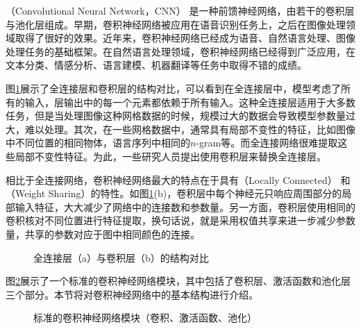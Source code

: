 （Convolutional Neural Network，CNN） 是一种前馈神经网络，由若干的卷积层与池化层组成。早期，卷积神经网络被应用在语音识别任务上，之后在图像处理领域取得了很好的效果。近年来，卷积神经网络已经成为语音、自然语言处理、图像处理任务的基础框架。在自然语言处理领域，卷积神经网络已经得到广泛应用，在文本分类、情感分析、语言建模、机器翻译等任务中取得不错的成绩。

\parinterval 图\ref{fig:11-1}展示了全连接层和卷积层的结构对比，可以看到在全连接层中，模型考虑了所有的输入，层输出中的每一个元素都依赖于所有输入。这种全连接层适用于大多数任务，但是当处理图像这种网格数据的时候，规模过大的数据会导致模型参数量过大，难以处理。其次，在一些网格数据中，通常具有局部不变性的特征，比如图像中不同位置的相同物体，语言序列中相同的$n$-gram等。而全连接网络很难提取这些局部不变性特征。为此，一些研究人员提出使用卷积层来替换全连接层。

\parinterval 相比于全连接网络，卷积神经网络最大的特点在于具有{\small{}}（Locally Connected） 和{\small{}}（Weight Sharing）的特性。如图\ref{fig:11-1}(b)，卷积层中每个神经元只响应周围部分的局部输入特征，大大减少了网络中的连接数和参数量。另一方面，卷积层使用相同的卷积核对不同位置进行特征提取，换句话说，就是采用权值共享来进一步减少参数量，共享的参数对应于图中相同颜色的连接。

\begin{figure}[htp]
\centering
%
\subfigure[全连接层]{}
\hspace{2cm}
\subfigure[卷积层]{}
\caption{全连接层（a）与卷积层（b）的结构对比}
\label{fig:11-1}
\end{figure}
\vspace{-0.8em}
\parinterval 图\ref{fig:11-2}展示了一个标准的卷积神经网络模块，其中包括了卷积层、激活函数和池化层三个部分。本节将对卷积神经网络中的基本结构进行介绍。
\vspace{-0.8em}
\begin{figure}[htp]
\centering

\caption{标准的卷积神经网络模块（卷积、激活函数、池化）}
\label{fig:11-2}
\end{figure}


